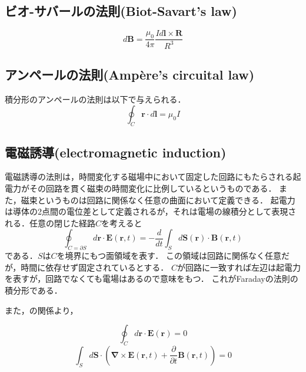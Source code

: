 \subsection{ビオ-サバールの法則(Biot-Savart's law)\cite{1130282271626280192}}
\begin{equation}
	d\boldsymbol{B}=\frac{\mu_{0}}{4\pi}\frac{Id\boldsymbol{l}\times \boldsymbol{R}}{R^{3}}
\end{equation}

\subsection{アンペールの法則(Ampère's circuital law) \cite{12}}
積分形のアンペールの法則は以下で与えられる．
\begin{equation}
	\oint_{C} \boldsymbol{\boldsymbol{r}}\cdot d\boldsymbol{l}=\mu_{0}I
\end{equation}

\subsection{電磁誘導(electromagnetic induction)\cite{titech}}
電磁誘導の法則は，時間変化する磁場中において固定した回路にもたらされる起電力がその回路を貫く磁束の時間変化に比例しているというものである．
また，磁束というものは回路に関係なく任意の曲面において定義できる．
起電力は導体の2点間の電位差として定義されるが，それは電場の線積分として表現される．任意の閉じた経路$C$を考えると 
\begin{equation}
	\oint_{C=\partial S}d\boldsymbol{r}\cdot \boldsymbol{E}(\boldsymbol{r}, t)=-\frac{d}{dt}\int_{S}d\boldsymbol{S}(\boldsymbol{r})\cdot \boldsymbol{B}(\boldsymbol{r}, t)
\end{equation}
である．$S$は$C$を境界にもつ面領域を表す．
この領域は回路に関係なく任意だが，時間に依存せず固定されているとする．
$C$が回路に一致すれば左辺は起電力を表すが，回路でなくても電場はあるので意味をもつ．
これがFaradayの法則の積分形である．

また，の関係より，

\begin{equation}
	\oint_{C}d\boldsymbol{r}\cdot \boldsymbol{E}(\boldsymbol{r})=0
	\label{eq:sto}
\end{equation}
\begin{equation}
\int_{S}d\boldsymbol{S}\cdot \left(\boldsymbol{\nabla} \times \boldsymbol{E}(\boldsymbol{r}, t)+\frac{\partial}{\partial t}\boldsymbol{B}(\boldsymbol{r}, t)\right)=0
\end{equation}

